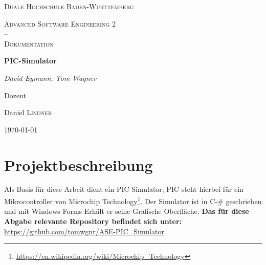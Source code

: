 \documentclass[12pt,a4paper,titlepage,ngerman,pdftex]{report}
\begin{document}
    \begin{titlepage}
        \centering
        {\scshape\LARGE Duale Hochschule Baden-Württemberg \par}
        \vspace{1cm}
        {\scshape\Large Advanced Software Engineering 2 \\--\\ Dokumentation\par}
        \vspace{1.5cm}
        {\huge\bfseries PIC-Simulator\par}
        \vspace{2cm}
        {\Large\itshape David Eymann, Tom Wagner\par}
        \vfill
        Dozent\par
        Daniel \textsc{Lindner}

        \vfill

        {\large \today\par}
    \end{titlepage}

    \tableofcontents
    \listoffigures
    \lstlistoflistings

    \onehalfspacing

    \chapter{Projektbeschreibung}\label{ch:projektbeschreibung}
    Als Basis für diese Arbeit dient ein PIC-Simulator, PIC steht hierbei für ein Mikrocontroller von Microchip Technology\footnote{\url{https://en.wikipedia.org/wiki/Microchip_Technology}}.
    Der Simulator ist in C-\# geschrieben und mit Windows Forms Erhält er seine Grafische Oberfläche.
    \textbf{Das für diese Abgabe relevante Repository befindet sich unter:} \\ \url{https://github.com/tomwgnr/ASE-PIC_Simulator}\\
    
    
\end{document}

